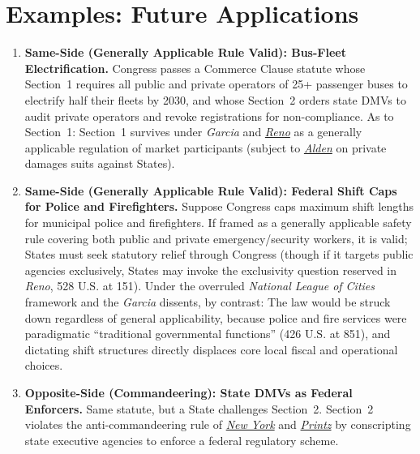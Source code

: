 \documentclass[12pt]{article}
\begin{document}
\section{Examples: Future Applications}
\begin{enumerate}

\item \textbf{Same-Side (Generally Applicable Rule Valid): Bus-Fleet Electrification.} Congress passes a Commerce Clause statute whose Section~1 requires all public and private operators of 25+ passenger buses to electrify half their fleets by 2030, and whose Section~2 orders state DMVs to audit private operators and revoke registrations for non-compliance. As to Section~1: Section~1 survives under \textit{Garcia} and \href{https://supreme.justia.com/cases/federal/us/528/141/}{\textit{Reno}} as a generally applicable regulation of market participants (subject to \href{https://supreme.justia.com/cases/federal/us/527/706/}{\textit{Alden}} on private damages suits against States).

\item \textbf{Same-Side (Generally Applicable Rule Valid): Federal Shift Caps for Police and Firefighters.} Suppose Congress caps maximum shift lengths for municipal police and firefighters. If framed as a generally applicable safety rule covering both public and private emergency/security workers, it is valid; States must seek statutory relief through Congress (though if it targets public agencies exclusively, States may invoke the exclusivity question reserved in \textit{Reno}, 528 U.S. at 151). Under the overruled \textit{National League of Cities} framework and the \textit{Garcia} dissents, by contrast: The law would be struck down regardless of general applicability, because police and fire services were paradigmatic ``traditional governmental functions'' (426 U.S. at 851), and dictating shift structures directly displaces core local fiscal and operational choices.

\item \textbf{Opposite-Side (Commandeering): State DMVs as Federal Enforcers.} Same statute, but a State challenges Section~2. Section~2 violates the anti-commandeering rule of \href{https://supreme.justia.com/cases/federal/us/505/144/}{\textit{New York}} and \href{https://supreme.justia.com/cases/federal/us/521/898/}{\textit{Printz}} by conscripting state executive agencies to enforce a federal regulatory scheme.


\end{enumerate}
\end{document}
